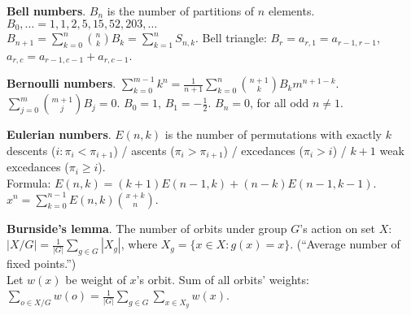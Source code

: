\documentclass[a4paper, 12pt]{article}
\let\ge=\geqslant
\newcommand{\Topic}[1]{\textbf{#1}}
\begin{document}
\Topic{Bell numbers}.
$B_n$ is the number of partitions of $n$ elements. 
$B_0, \ldots = 1,1,2,5,15,52,203,\ldots$ \\
$B_{n+1} = \sum_{k=0}^n {n \choose k} B_k = \sum_{k=1}^n S_{n,k}$.
Bell triangle: $B_r=a_{r,1}=a_{r-1,r-1}$, $a_{r,c}=a_{r-1,c-1}+a_{r,c-1}$.

\Topic{Bernoulli numbers}.
$\sum_{k=0}^{m-1} k^n =
\frac{1}{n+1} \sum_{k=0}^n {n+1 \choose k} B_k m^{n+1-k}$. \\
$\sum_{j=0}^m {m+1 \choose j} B_j = 0$.
\quad $B_0=1$, $B_1=-\frac{1}{2}$. $B_n=0$, for all odd $n \ne 1$.


\Topic{Eulerian numbers}.
$E(n,k)$ is the number of permutations with exactly
$k$ descents ($i: \pi_i < \pi_{i+1}$) /
ascents ($\pi_i > \pi_{i+1}$) /
excedances ($\pi_i > i$) /
$k+1$ weak excedances ($\pi_i \ge i$). \\
Formula: $E(n,k)=(k+1)E(n-1,k)+(n-k)E(n-1,k-1)$. \quad
$x^n = \sum_{k=0}^{n-1} E(n,k) {x+k \choose n}$.

\Topic{Burnside's lemma}.
The number of orbits under group $G$'s action on set $X$:\\
$|X/G| = \frac{1}{|G|} \sum_{g \in G} |X_g|$,
where $X_g=\{ x \in X: g(x)=x \}$. (``Average number of fixed points.'') \\
Let $w(x)$ be weight of $x$'s orbit. Sum of all orbits' weights:
$\sum_{o \in X/G} w(o) = \frac{1}{|G|} \sum_{g \in G} \sum_{x \in X_g} w(x)$.



\end{document}
